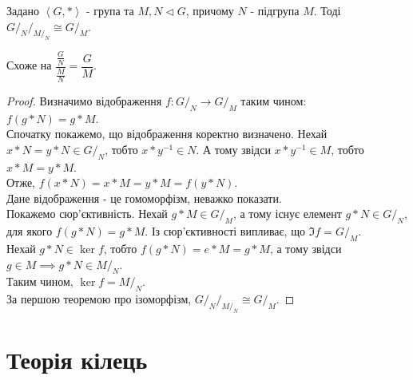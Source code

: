\documentclass{math_library}
\begin{document}
\begin{theorem}
Задано $\left< G, * \right>$ - група та $M,N \triangleleft G$, причому $N$ - підгрупа $M$. Тоді\\
${\scriptstyle G/_N}/_{M/_N} \cong G/_M$.
\end{theorem}

\begin{remark}
Схоже на $\dfrac{\frac{G}{N}}{\frac{M}{N}} = \dfrac{G}{M}$.
\end{remark}

\begin{proof}
Визначимо відображення $f: G/_N \to G/_M$ таким чином:\\
$f(g*N) = g*M$.\\
Спочатку покажемо, що відображення коректно визначено. Нехай $x*N = y*N \in G/_N$, тобто $x*y^{-1} \in N$. А тому звідси $x*y^{-1} \in M$, тобто $x*M = y*M$.\\
Отже, $f(x*N) = x*M = y*M = f(y*N)$.\\
Дане відображення - це гомоморфізм, неважко показати.\\
Покажемо сюр'єктивність. Нехай $g*M \in G/_M$, а тому існує елемент $g*N \in G/_N$, для якого $f(g*N) = g*M$. Із сюр'єктивності випливає, що $\Im f = G/_M$.\\
Нехай $g*N \in \ker f$, тобто $f(g*N) = e*M = g*M$, а тому звідси $g \in M \implies g*N \in M/_N$.\\
Таким чином, $\ker f = M/_N$.\\
За першою теоремою про ізоморфізм, ${\scriptstyle G/_N}/_{M/_N} \cong G/_M$.
\end{proof}
\newpage

\fi

\iffalse
\section{Теорія кілець}
\end{document}

